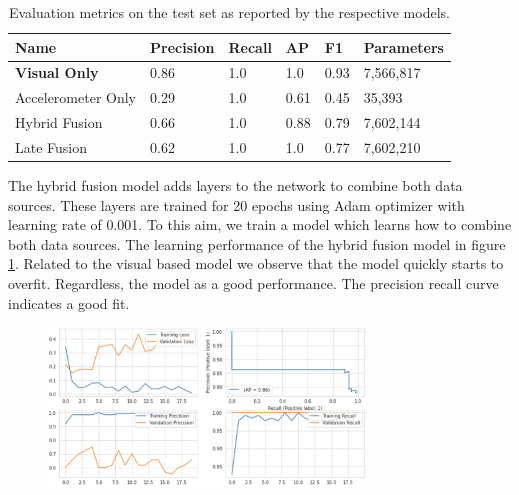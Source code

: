 \begin{table}[ht]
\centering
\begin{tabular}{|l|l|l|l|l|l|}
\hline
\textbf{Name}      & \textbf{Precision} & \textbf{Recall} & \textbf{AP} & \textbf{F1} & \textbf{Parameters} \\ \hline
\textbf{Visual Only}        & 0.86               & 1.0             & 1.0         & 0.93        & 7,566,817  \\ \hline
Accelerometer Only & 0.29               & 1.0             & 0.61        & 0.45        & 35,393     \\ \hline
Hybrid Fusion      & 0.66               & 1.0             & 0.88        & 0.79        & 7,602,144  \\ \hline
Late Fusion        & 0.62               & 1.0             & 1.0         & 0.77        & 7,602,210  \\ \hline
\end{tabular}
\caption{Evaluation metrics on the test set as reported by the respective models.}
\label{tab:results-fusion}
\end{table}

The hybrid fusion model adds layers to the network to combine both data sources. These layers are trained for 20 epochs using Adam optimizer with learning rate of 0.001. To this aim, we train a model which learns how to combine both data sources. The learning performance of the hybrid fusion model in figure \ref{fig:dense-network}. Related to the visual based model we observe that the model quickly starts to overfit. Regardless, the model as a good performance. The precision recall curve indicates a good fit.

\begin{figure}[ht]
\begin{center}
\includegraphics[width=0.75\textwidth]{images/6_results/results-hybrid-fusion.png}
\captionsetup{width=0.90\textwidth}
\label{fig:dense-network}
\end{center}
\end{figure}


